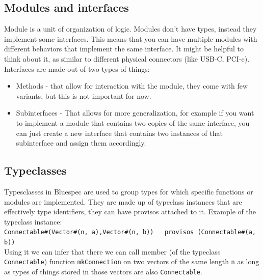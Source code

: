 \documentclass[12pt]{report}
\begin{document}
\subsection{Modules and interfaces}
Module is a unit of organization of logic. Modules don't have types, instead they implement some interfaces. This means that you can have multiple modules with different behaviors that implement the same interface. It might be helpful to think about it, as similar to different physical connectors (like USB-C, PCI-e). Interfaces are made out of two types of things:
\begin{itemize}
    \item Methods - that allow for interaction with the module, they come with few variants, but this is not important for now.
    \item Subinterfaces - That allows for more generalization, for example if you want to implement a module that contains two copies of the same interface, you can just create a new interface that contains two instances of that subinterface and assign them accordingly.
\end{itemize}

\subsection{Typeclasses}
\label{sec:Typeclasses}
Typesclasses in Bluespec are used to group types for which specific functions or modules are implemented. They are made up of typeclass instances that are effectively type identifiers, they can have provisos attached to it. Example of the typeclass instance: \\
 \verb!Connectable#(Vector#(n, a),Vector#(n, b))   provisos (Connectable#(a, b))! \\
Using it we can infer that there we can call member (of the typeclass \verb!Connectable!) function \verb!mkConnection! on two vectors of the same length \verb!n! as long as types of things stored in those vectors are also \verb!Connectable!. 
\end{document}
